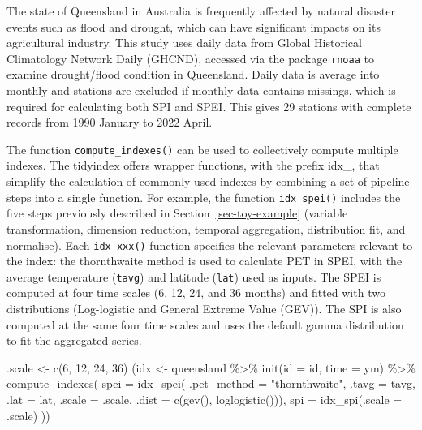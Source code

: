 \documentclass[
]{interact}
\newenvironment{Shaded}{\begin{snugshade}}{\end{snugshade}}
\newcommand{\AttributeTok}[1]{\textcolor[rgb]{0.40,0.45,0.13}{#1}}
\newcommand{\DecValTok}[1]{\textcolor[rgb]{0.68,0.00,0.00}{#1}}
\newcommand{\FunctionTok}[1]{\textcolor[rgb]{0.28,0.35,0.67}{#1}}
\newcommand{\NormalTok}[1]{\textcolor[rgb]{0.00,0.23,0.31}{#1}}
\newcommand{\OtherTok}[1]{\textcolor[rgb]{0.00,0.23,0.31}{#1}}
\newcommand{\SpecialCharTok}[1]{\textcolor[rgb]{0.37,0.37,0.37}{#1}}
\newcommand{\StringTok}[1]{\textcolor[rgb]{0.13,0.47,0.30}{#1}}
\begin{document}
The state of Queensland in Australia is frequently affected by natural
disaster events such as flood and drought, which can have significant
impacts on its agricultural industry. This study uses daily data from
Global Historical Climatology Network Daily (GHCND), accessed via the
package \texttt{rnoaa} to examine drought/flood condition in Queensland.
Daily data is average into monthly and stations are excluded if monthly
data contains missings, which is required for calculating both SPI and
SPEI. This gives 29 stations with complete records from 1990 January to
2022 April.

The function \texttt{compute\_indexes()} can be used to collectively
compute multiple indexes. The tidyindex offers wrapper functions, with
the prefix idx\_, that simplify the calculation of commonly used indexes
by combining a set of pipeline steps into a single function. For
example, the function \texttt{idx\_spei()} includes the five steps
previously described in Section~\ref{sec-toy-example} (variable
transformation, dimension reduction, temporal aggregation, distribution
fit, and normalise). Each \texttt{idx\_xxx()} function specifies the
relevant parameters relevant to the index: the thornthwaite method is
used to calculate PET in SPEI, with the average temperature
(\texttt{tavg}) and latitude (\texttt{lat}) used as inputs. The SPEI is
computed at four time scales (6, 12, 24, and 36 months) and fitted with
two distributions (Log-logistic and General Extreme Value (GEV)). The
SPI is also computed at the same four time scales and uses the default
gamma distribution to fit the aggregated series.

\begin{Shaded}
\begin{Highlighting}[]
\NormalTok{.scale }\OtherTok{\textless{}{-}} \FunctionTok{c}\NormalTok{(}\DecValTok{6}\NormalTok{, }\DecValTok{12}\NormalTok{, }\DecValTok{24}\NormalTok{, }\DecValTok{36}\NormalTok{)}
\NormalTok{(idx }\OtherTok{\textless{}{-}}\NormalTok{ queensland }\SpecialCharTok{\%\textgreater{}\%}
  \FunctionTok{init}\NormalTok{(}\AttributeTok{id =}\NormalTok{ id, }\AttributeTok{time =}\NormalTok{ ym) }\SpecialCharTok{\%\textgreater{}\%}
  \FunctionTok{compute\_indexes}\NormalTok{(}
    \AttributeTok{spei =} \FunctionTok{idx\_spei}\NormalTok{(}
      \AttributeTok{.pet\_method =} \StringTok{"thornthwaite"}\NormalTok{, }\AttributeTok{.tavg =}\NormalTok{ tavg, }\AttributeTok{.lat =}\NormalTok{ lat,}
      \AttributeTok{.scale =}\NormalTok{ .scale, }\AttributeTok{.dist =} \FunctionTok{c}\NormalTok{(}\FunctionTok{gev}\NormalTok{(), }\FunctionTok{loglogistic}\NormalTok{())),}
    \AttributeTok{spi =} \FunctionTok{idx\_spi}\NormalTok{(}\AttributeTok{.scale =}\NormalTok{ .scale)}
\NormalTok{  ))}
\end{Highlighting}
\end{Shaded}
\end{document}
